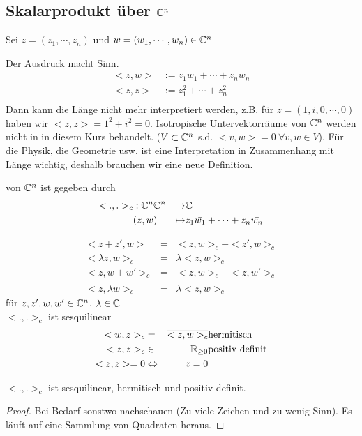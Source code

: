 \subsection{Skalarprodukt über $\mathbb{C}^n$}
Sei $z=(z_1,\cdots,z_n)$ und $w=(w_1,\cdots,w_n)\in\mathbb{C}^n$
\begin{Bem}
  Der Ausdruck macht Sinn.
  \begin{align*}
    <z,w>&:=z_1w_1+\cdots+z_nw_n\\
    <z,z>&:=z_1^2+\cdots+z_n^2\\
  \end{align*}
  Dann kann die Länge nicht mehr interpretiert werden, z.B. für $z=(1,i,0,\cdots,0)$ haben wir $<z,z>=1^2+i^2=0$. Isotropische Untervektorräume von $\mathbb{C}^n$ werden nicht in in diesem Kurs behandelt. ($V\subset\mathbb{C}^n$ s.d. $<v,w>=0 \ \forall v,w\in V$). Für die Physik, die Geometrie usw. ist eine Interpretation in Zusammenhang mit Länge wichtig, deshalb brauchen wir eine neue Definition.
\end{Bem}
\begin{Def}
  von $\mathbb{C}^n$ ist gegeben durch
  \begin{align*}
    <.,.>_c&:\mathbb{C}^n\mathbb{C}^n&\to&\mathbb{C}\\
    & (z,w)&\mapsto&z_1\bar{w_1}+\cdots+z_n\bar{w_n}
  \end{align*}
\end{Def}
\begin{Eig}[von $<.,>_c$]
  \begin{align*}
    <z+z',w>&=& <z,w>_c+<z',w>_c\\
    <\lambda z,w>_c&=& \lambda<z,w>_c\\
    <z,w+w'>_c&=& <z,w>_c+<z,w'>_c\\
    <z,\lambda w>_c&=& \bar{\lambda}<z,w>_c
  \end{align*}
  für $z,z',w,w'\in\mathbb{C}^n$, $\lambda\in\mathbb{C}$\\
  $<.,.>_c$ ist sesquilinear
  \begin{align*}
    <w,z>_c&=& \overline{<z,w>_c}& \text{hermitisch}\\
    <z,z>_c&\in&\mathbb{R}_{\geq 0}& \text{positiv definit}\\
    <z,z>=0 &\Leftrightarrow& z=0
  \end{align*}
\end{Eig}
\begin{Faz}
  $<.,.>_c$ ist sesquilinear, hermitisch und positiv definit.
\end{Faz}
\begin{proof}
  Bei Bedarf sonstwo nachschauen (Zu viele Zeichen und zu wenig Sinn). Es läuft auf eine Sammlung von Quadraten heraus.
\end{proof}
